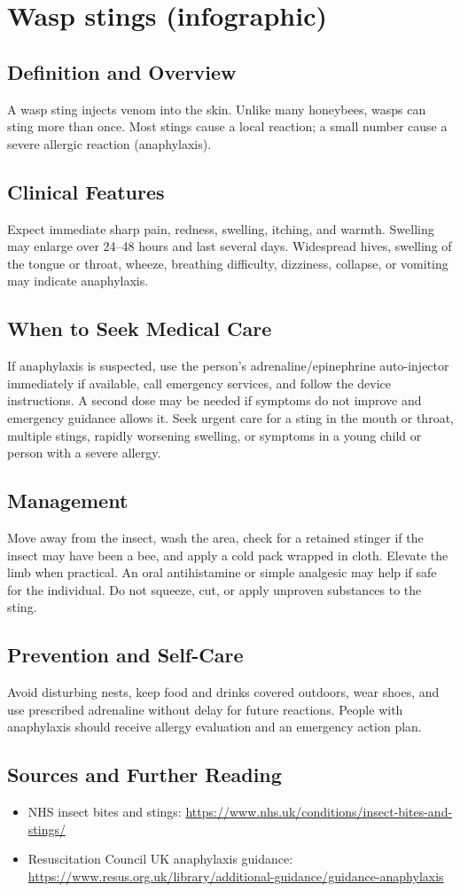 \chapter{Wasp stings (infographic)}
\section*{Definition and Overview}
A wasp sting injects venom into the skin. Unlike many honeybees, wasps can sting more than once. Most stings cause a local reaction; a small number cause a severe allergic reaction (anaphylaxis).
\section*{Clinical Features}
Expect immediate sharp pain, redness, swelling, itching, and warmth. Swelling may enlarge over 24--48 hours and last several days. Widespread hives, swelling of the tongue or throat, wheeze, breathing difficulty, dizziness, collapse, or vomiting may indicate anaphylaxis.
\section*{When to Seek Medical Care}
If anaphylaxis is suspected, use the person's adrenaline/epinephrine auto-injector immediately if available, call emergency services, and follow the device instructions. A second dose may be needed if symptoms do not improve and emergency guidance allows it. Seek urgent care for a sting in the mouth or throat, multiple stings, rapidly worsening swelling, or symptoms in a young child or person with a severe allergy.
\section*{Management}
Move away from the insect, wash the area, check for a retained stinger if the insect may have been a bee, and apply a cold pack wrapped in cloth. Elevate the limb when practical. An oral antihistamine or simple analgesic may help if safe for the individual. Do not squeeze, cut, or apply unproven substances to the sting.
\section*{Prevention and Self-Care}
Avoid disturbing nests, keep food and drinks covered outdoors, wear shoes, and use prescribed adrenaline without delay for future reactions. People with anaphylaxis should receive allergy evaluation and an emergency action plan.
\section*{Sources and Further Reading}
\begin{itemize}
    \item NHS insect bites and stings: \url{https://www.nhs.uk/conditions/insect-bites-and-stings/}
    \item Resuscitation Council UK anaphylaxis guidance: \url{https://www.resus.org.uk/library/additional-guidance/guidance-anaphylaxis}
\end{itemize}
